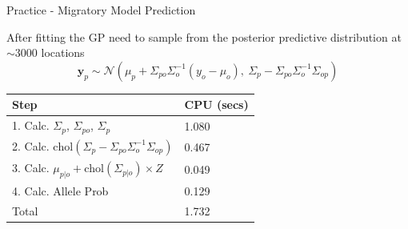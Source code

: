 \documentclass[11pt,ignorenonframetext,]{beamer}
\begin{document}
\begin{frame}{Practice - Migratory Model Prediction}
\protect\hypertarget{practice---migratory-model-prediction}{}

After fitting the GP need to sample from the posterior predictive
distribution at \(\sim3000\) locations
\[ \symbf{y}_{p} \sim \mathcal{N}\left(\mu_p + \Sigma_{po} \Sigma_o^{-1}(y_o - \mu_o) ,~ \Sigma_p - \Sigma_{po} \Sigma_{o}^{-1} \Sigma_{op}\right) \]

\pause

\scriptsize

\begin{longtable}[]{@{}ll@{}}
\toprule
\begin{minipage}[b]{0.59\columnwidth}\raggedright
Step\strut
\end{minipage} & \begin{minipage}[b]{0.35\columnwidth}\raggedright
CPU (secs)\strut
\end{minipage}\tabularnewline
\midrule
\endhead
\begin{minipage}[t]{0.59\columnwidth}\raggedright
1. Calc. \(\Sigma_p\), \(\Sigma_{po}\), \(\Sigma_{p}\)\strut
\end{minipage} & \begin{minipage}[t]{0.35\columnwidth}\raggedright
1.080\strut
\end{minipage}\tabularnewline
\begin{minipage}[t]{0.59\columnwidth}\raggedright
2. Calc.
\(\text{chol}(\Sigma_p - \Sigma_{po} \Sigma_{o}^{-1} \Sigma_{op})\)\strut
\end{minipage} & \begin{minipage}[t]{0.35\columnwidth}\raggedright
0.467\strut
\end{minipage}\tabularnewline
\begin{minipage}[t]{0.59\columnwidth}\raggedright
3. Calc. \(\mu_{p|o} + \text{chol}(\Sigma_{p|o}) \times Z\)\strut
\end{minipage} & \begin{minipage}[t]{0.35\columnwidth}\raggedright
0.049\strut
\end{minipage}\tabularnewline
\begin{minipage}[t]{0.59\columnwidth}\raggedright
4. Calc. Allele Prob\strut
\end{minipage} & \begin{minipage}[t]{0.35\columnwidth}\raggedright
0.129\strut
\end{minipage}\tabularnewline
\begin{minipage}[t]{0.59\columnwidth}\raggedright
Total\strut
\end{minipage} & \begin{minipage}[t]{0.35\columnwidth}\raggedright
1.732\strut
\end{minipage}\tabularnewline
\bottomrule
\end{longtable}


\end{frame}
\end{document}
